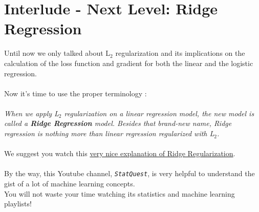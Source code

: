 
\section*{Interlude - Next Level: Ridge Regression}

Until now we only talked about L$_2$ regularization and its implications on the 
calculation of the loss function and gradient for both the linear and the logistic regression.\\
\\
Now it's time to use the proper terminology :\\ 
\\
\emph{When we apply L$_2$ regularization on a linear regression model, the new model is 
called a \textbf{Ridge Regression} model.
Besides that brand-new name, Ridge regression is nothing more than 
linear regression regularized with L$_2$.}\\
\\
We suggest you watch this \href{https://www.youtube.com/watch?v=Q81RR3yKn30}{very nice 
explanation of Ridge Regularization}.\\
\\
By the way, this Youtube channel, \texttt{\textit{StatQuest}}, is very helpful to 
understand the gist of a lot of machine learning concepts.\\
You will not waste your time watching its statistics and machine learning playlists!
